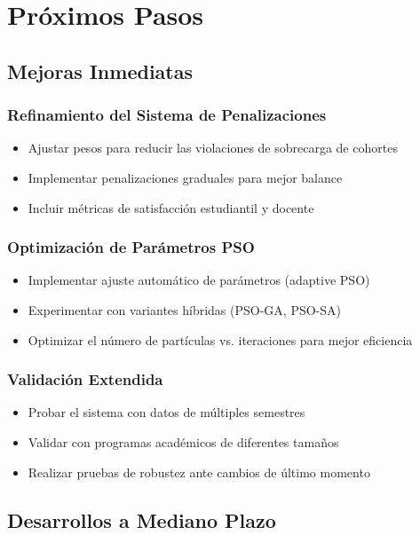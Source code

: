 \section{Próximos Pasos}

\subsection{Mejoras Inmediatas}

\subsubsection{Refinamiento del Sistema de Penalizaciones}
\begin{itemize}
    \item Ajustar pesos para reducir las violaciones de sobrecarga de cohortes
    \item Implementar penalizaciones graduales para mejor balance
    \item Incluir métricas de satisfacción estudiantil y docente
\end{itemize}

\subsubsection{Optimización de Parámetros PSO}
\begin{itemize}
    \item Implementar ajuste automático de parámetros (adaptive PSO)
    \item Experimentar con variantes híbridas (PSO-GA, PSO-SA)
    \item Optimizar el número de partículas vs. iteraciones para mejor eficiencia
\end{itemize}

\subsubsection{Validación Extendida}
\begin{itemize}
    \item Probar el sistema con datos de múltiples semestres
    \item Validar con programas académicos de diferentes tamaños
    \item Realizar pruebas de robustez ante cambios de último momento
\end{itemize}

\subsection{Desarrollos a Mediano Plazo}

